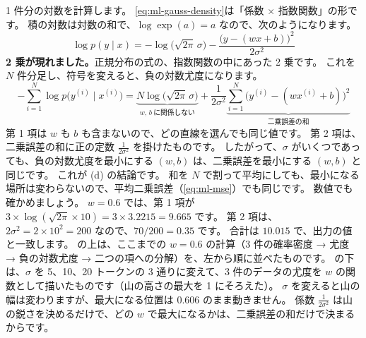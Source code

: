 1 件分の対数を計算します。
\eqref{eq:ml-gauss-density}は「係数 $\times$ 指数関数」の形です。
積の対数は対数の和で、$\log\exp(a) = a$ なので、次のようになります。
\begin{equation}
\log p(y \mid x) = -\log\bigl(\sqrt{2\pi}\,\sigma\bigr) - \frac{\bigl(y - (wx+b)\bigr)^2}{2\sigma^2}
\end{equation}
\textbf{2 乗が現れました。}正規分布の式の、指数関数の中にあった 2 乗です。
これを $N$ 件分足し、符号を変えると、負の対数尤度になります。
\begin{equation}
-\sum_{i=1}^{N}\log p\bigl(y^{(i)} \mid x^{(i)}\bigr)
= \underbrace{N\log\bigl(\sqrt{2\pi}\,\sigma\bigr)}_{w,\,b\ \text{に関係しない}}
+ \frac{1}{2\sigma^2}\underbrace{\sum_{i=1}^{N}\bigl(y^{(i)} - (wx^{(i)}+b)\bigr)^2}_{\text{二乗誤差の和}}
\label{eq:ml-gauss-nll}
\end{equation}
第 1 項は $w$ も $b$ も含まないので、どの直線を選んでも同じ値です。
第 2 項は、二乗誤差の和に正の定数 $\frac{1}{2\sigma^2}$ を掛けたものです。
したがって、$\sigma$ がいくつであっても、負の対数尤度を最小にする $(w,b)$ は、二乗誤差を最小にする $(w,b)$ と同じです。
これが (d) の結論です。
和を $N$ で割って平均にしても、最小になる場所は変わらないので、平均二乗誤差（\eqref{eq:ml-mse}）でも同じです。
数値でも確かめましょう。
$w=0.6$ では、第 1 項が $3\times\log(\sqrt{2\pi}\times 10) = 3\times3.2215 = 9.665$ です。
第 2 項は、$2\sigma^2 = 2\times10^2 = 200$ なので、$70/200 = 0.35$ です。
合計は $10.015$ で、出力の値と一致します。
の上は、ここまでの $w=0.6$ の計算（3 件の確率密度 → 尤度 → 負の対数尤度 → 二つの項への分解）を、左から順に並べたものです。
の下は、$\sigma$ を 5、10、20 トークンの 3 通りに変えて、3 件のデータの尤度を $w$ の関数として描いたものです（山の高さの最大を 1 にそろえた）。
$\sigma$ を変えると山の幅は変わりますが、最大になる位置は 0.606 のまま動きません。
係数 $\frac{1}{2\sigma^2}$ は山の鋭さを決めるだけで、どの $w$ で最大になるかは、二乗誤差の和だけで決まるからです。

